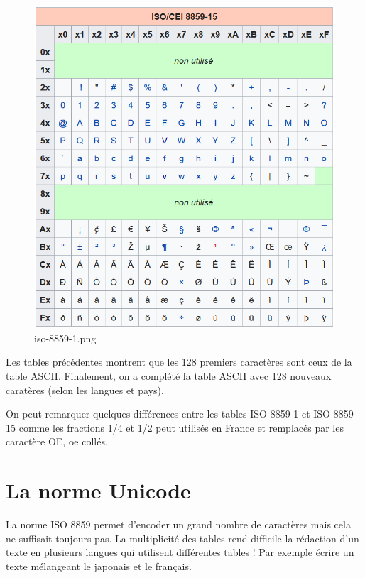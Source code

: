 \documentclass[11pt]{article}
\begin{document}
    \begin{figure}
\centering
\includegraphics{img/iso-8859-15.png}
\caption{iso-8859-1.png}
\end{figure}

Les tables précédentes montrent que les 128 premiers caractères sont
ceux de la table ASCII. Finalement, on a complété la table ASCII avec
128 nouveaux caratères (selon les langues et pays).

On peut remarquer quelques différences entre les tables ISO 8859-1 et
ISO 8859-15 comme les fractions 1/4 et 1/2 peut utilisés en France et
remplacés par les caractère OE, oe collés.

    \hypertarget{la-norme-unicode}{%
\section{La norme Unicode}\label{la-norme-unicode}}

La norme ISO 8859 permet d'encoder un grand nombre de caractères mais
cela ne suffisait toujours pas. La multiplicité des tables rend
difficile la rédaction d'un texte en plusieurs langues qui utilisent
différentes tables ! Par exemple écrire un texte mélangeant le japonais
et le français.
\end{document}
